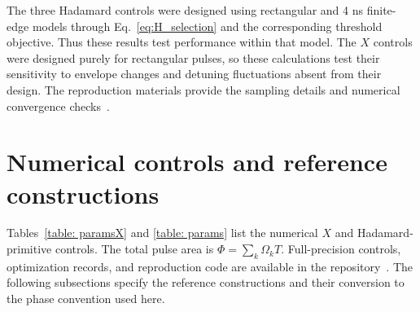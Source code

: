 \documentclass[10pt,aps,twocolumn,pra,floatfix,superscriptaddress]{revtex4-2}
\begin{document}
The three Hadamard controls were designed using rectangular and
4 ns finite-edge models through Eq.~\eqref{eq:H_selection} and the
corresponding threshold objective. Thus these results 
test performance within that model. The $X$ controls were designed purely for rectangular pulses, so these calculations test their sensitivity to envelope changes and detuning fluctuations absent from their
design. The reproduction materials provide the sampling details and
numerical convergence checks~\cite{my_github_repo}.

\section{Numerical controls and reference constructions}
\label{app:numerical_controls}

Tables~\ref{table: paramsX} and \ref{table: params} list the numerical
$X$ and Hadamard-primitive controls. The total pulse area is
$\Phi=\sum_k\Omega_kT$. Full-precision controls, optimization records,
and reproduction code are available in the repository~\cite{my_github_repo}.
The following subsections specify the reference constructions and
their conversion to the phase convention used here.
\end{document}
